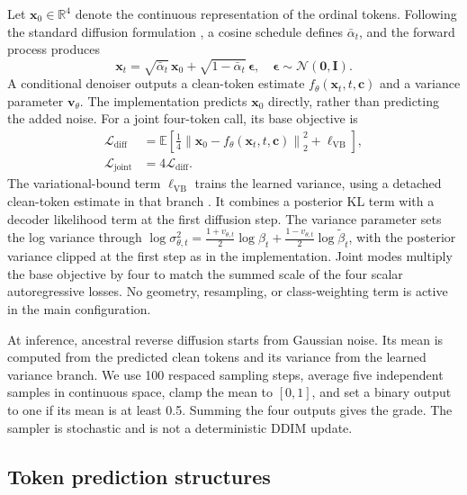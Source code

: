 \documentclass[a4paper,fleqn]{cas-sc}
\begin{document}
Let $\mathbf{x}_0\in\mathbb{R}^{4}$ denote the continuous representation of the ordinal tokens. Following the standard diffusion formulation \citep{ho2020ddpm,song2021ddim}, a cosine schedule defines $\bar\alpha_t$, and the forward process produces
\begin{equation}
  \mathbf{x}_t=\sqrt{\bar\alpha_t}\,\mathbf{x}_0+
  \sqrt{1-\bar\alpha_t}\,\boldsymbol{\epsilon},
  \quad \boldsymbol{\epsilon}\sim\mathcal{N}(\mathbf{0},\mathbf{I}).
  \label{eq:forward}
\end{equation}
A conditional denoiser outputs a clean-token estimate $f_{\theta}(\mathbf{x}_t,t,\mathbf{c})$ and a variance parameter $\mathbf{v}_{\theta}$. The implementation predicts $\mathbf{x}_0$ directly, rather than predicting the added noise. For a joint four-token call, its base objective is
\begin{equation}
\begin{aligned}
  \mathcal{L}_{\mathrm{diff}}
  &=\mathbb{E}\left[\frac{1}{4}\left\|\mathbf{x}_0-
  f_{\theta}(\mathbf{x}_t,t,\mathbf{c})\right\|_2^2
  +\ell_{\mathrm{VB}}\right], \\
  \mathcal{L}_{\mathrm{joint}}&=4\mathcal{L}_{\mathrm{diff}}.
\end{aligned}
  \label{eq:diff}
\end{equation}
The variational-bound term $\ell_{\mathrm{VB}}$ trains the learned variance, using a detached clean-token estimate in that branch \citep{nichol2021improved}. It combines a posterior KL term with a decoder likelihood term at the first diffusion step. The variance parameter sets the log variance through $\log\sigma_{\theta,t}^{2}=\frac{1+v_{\theta,t}}{2}\log\beta_t+\frac{1-v_{\theta,t}}{2}\log\widetilde\beta_t$, with the posterior variance clipped at the first step as in the implementation. Joint modes multiply the base objective by four to match the summed scale of the four scalar autoregressive losses. No geometry, resampling, or class-weighting term is active in the main configuration.

At inference, ancestral reverse diffusion starts from Gaussian noise. Its mean is computed from the predicted clean tokens and its variance from the learned variance branch. We use 100 respaced sampling steps, average five independent samples in continuous space, clamp the mean to $[0,1]$, and set a binary output to one if its mean is at least 0.5. Summing the four outputs gives the grade. The sampler is stochastic and is not a deterministic DDIM update.

\subsection{Token prediction structures}
\label{sec:structures}
\end{document}

